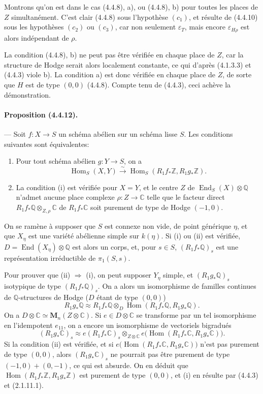 \documentclass[10pt]{article}
\newcommand{\C}{\mathbb C}
\newcommand{\Q}{\mathbb Q}
\newcommand{\Z}{\mathbb Z}
\newcommand{\Hom}{\operatorname{Hom}}
\newcommand{\iso}{\xrightarrow{\sim}}
\providecommand{\End}{\operatorname{End}}
\begin{document}
Montrons qu'on est dans le cas (4.4.8), a), ou (4.4.8), b) pour toutes les places de $Z$ simultanément. C'est clair (4.4.8) sous l'hypothèse $(c_1)$, et résulte de (4.4.10) sous les hypothèses $(c_2)$ ou $(c_3)$, car non seulement $\varepsilon_T$, mais encore $\varepsilon_{H\rho}$ est alors indépendant de $\rho$.

La condition (4.4.8), b) ne peut pas être vérifiée en chaque place de $Z$, car la structure de Hodge serait alors localement constante, ce qui d'après (4.1.3.3) et (4.4.3) viole b). La condition a) est donc vérifiée en chaque place de $Z$, de sorte que $H$ est de type $(0,0)$ (4.4.8). Compte tenu de (4.4.3), ceci achève la démonstration.

\paragraph{Proposition (4.4.12).} --- Soit $f:X\to S$ un schéma abélien sur un schéma lisse $S$. Les conditions suivantes sont équivalentes:
\begin{enumerate}[label=(\roman*)]
\item Pour tout schéma abélien $g:Y\to S$, on a
\[
\Hom_S(X,Y)\iso \Hom_S(R_1f_*\Z,R_1g_*\Z).
\]
\item La condition (i) est vérifiée pour $X=Y$, et le centre $Z$ de $\End_S(X)\otimes\Q$ n'admet aucune place complexe $\rho:Z\to\C$ telle que le facteur direct $R_1f_*\Q\otimes_{Z,\rho}\C$ de $R_1f_*\C$ soit purement de type de Hodge $(-1,0)$.
\end{enumerate}




On se ramène à supposer que $S$ est connexe non vide, de point générique $\eta$, et que $X_\eta$ est une variété abélienne simple sur $k(\eta)$. Si (i) ou (ii) est vérifiée, $D=\End(X_\eta)\otimes\Q$ est alors un corps, et, pour $s\in S$, $(R_1f_*\Q)_s$ est une représentation irréductible de $\pi_1(S,s)$.

Pour prouver que (ii) $\Rightarrow$ (i), on peut supposer $Y_\eta$ simple, et $(R_1g_*\Q)_s$ isotypique de type $(R_1f_*\Q)_s$. On a alors un isomorphisme de familles continues de $\Q$-structures de Hodge ($D$ étant de type $(0,0)$)
\[
R_1g_*\Q\approx R_1f_*\Q\otimes_D
\Hom(R_1f_*\Q,R_1g_*\Q).
\]
On a $D\otimes\C\simeq \mathbf{M}_n(Z\otimes\C)$. Si $e\in D\otimes\C$ se transforme par un tel isomorphisme en l'idempotent $e_{11}$, on a encore un isomorphisme de vectoriels bigradués
\[
(R_1g_*\C)_s\approx e(R_1f_*\C)_s\otimes_{Z\otimes\C}
e\bigl(\Hom(R_1f_*\C,R_1g_*\C)\bigr).
\]
Si la condition (ii) est vérifiée, et si $e\bigl(\Hom(R_1f_*\C,R_1g_*\C)\bigr)$ n'est pas purement de type $(0,0)$, alors $(R_1g_*\C)_s$ ne pourrait pas être purement de type $(-1,0)+(0,-1)$, ce qui est absurde. On en déduit que $\Hom(R_1f_*\Z,R_1g_*\Z)$ est purement de type $(0,0)$, et (i) en résulte par (4.4.3) et (2.1.11.1).
\end{document}
